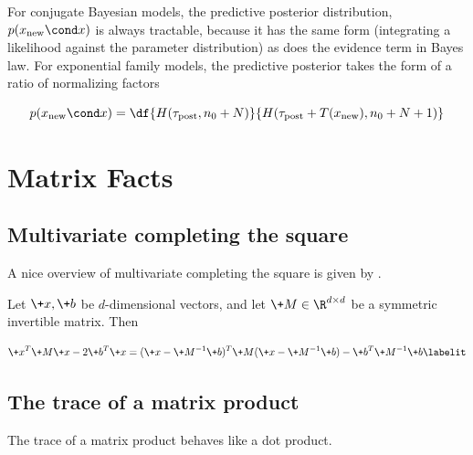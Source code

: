 \documentclass{article} %
\begin{document}
For conjugate Bayesian models, the predictive posterior distribution, $p(x_{\text{new}} \cond x)$ is always tractable, because it has the same form (integrating a likelihood against the parameter distribution) as does the evidence term in Bayes law.   For exponential family models, the predictive posterior takes the form of a ratio of normalizing factors

\begin{equation}
p(x_{\text{new}} \cond x) = \df{H(\tau_{\text{post}}, n_0 + N)}{H(\tau_{\text{post}} + T(x_{\text{new}}), n_0 + N + 1)}
\label{eqn:predictive_posterior_exptl_family}
\end{equation}




\newpage 
 \appendix
 

\section{Matrix Facts}

\subsection{Multivariate completing the square}

A nice overview of multivariate completing the square is given by \cite{gundersenXXXXcompleting}.    

Let $\+x,  \+b$ be $d$-dimensional vectors, and let $\+M \in \R^{d \times d}$ be a symmetric invertible matrix. Then

\begin{align*}
\+x^T \+M \+x - 2 \+b^T \+x = (\+x - \+M^{-1} \+b)^T \+M (\+x - \+M^{-1} \+b) - \+b^T \+M^{-1} \+b
 \labelit \label{eqn:multivariate_completing_the_square}
\end{align*}

% 

\subsection{The trace of a matrix product}

The trace of a matrix product behaves like a dot product.  
\end{document}
